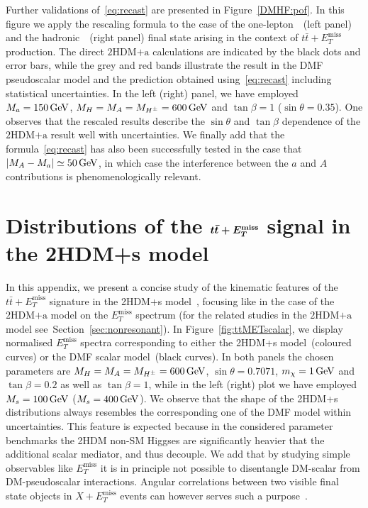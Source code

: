 \documentclass[a4paper, 11pt,notoc]{article}
\newcommand{\MET}{\ensuremath{E_T^\mathrm{miss}}\xspace}
\newcommand{\mA}{\ensuremath{M_{A}}\xspace}
\newcommand{\ma}{\ensuremath{M_{a}}\xspace}
\newcommand{\mH}{\ensuremath{M_{H}}\xspace}
\newcommand{\mHc}{\ensuremath{M_{H^{\pm}}}\xspace}
\newcommand{\hdma}{\ensuremath{\textrm{2HDM+a}}\xspace}
\def\bm#1{\mbox{\boldmath$#1$\unboldmath}}
\begin{document}
Further validations of~\eqref{eq:recast} are presented in Figure~\ref{DMHF:pof}. In this figure we apply the rescaling formula to the case of the  one-lepton~\cite{Aaboud:2017aeu}~(left panel)   and the hadronic~\cite{Aaboud:2017rzf}~(right panel)  final state arising in the context of $t \bar t+\MET$ production. The direct \hdma calculations are indicated by the black dots and error bars, while the grey and red  bands illustrate the result in the DMF pseudoscalar model and the prediction obtained using~\eqref{eq:recast} including statistical uncertainties.  In the left (right) panel, we have employed $\ma = 150 \, {\rm GeV}$, $\mH= \mA = \mHc = 600 \, {\rm GeV}$ and $\tan \beta = 1$ ($\sin\theta=0.35$). One observes that the rescaled results describe the $\sin \theta$ and $\tan \beta$ dependence of the \hdma result well with uncertainties.  We finally add that the formula~\eqref{eq:recast} has also been successfully tested in the case that $|\mA - \ma| \simeq 50 \, {\rm GeV}$, in which case the interference between the $a$ and $A$ contributions is phenomenologically relevant.  


\section{Distributions of the $\bm{t \bar t + \MET}$ signal in the 2HDM+s model}
\label{app:ttMETscalar}

In this appendix, we present a concise study of the kinematic features of the  $t \bar t + \MET$ signature in the 2HDM+s model~\cite{Bell:2016ekl,Bell:2017rgi}, focusing like in the case of the  \hdma model on the $\MET$ spectrum (for the related studies in the \hdma model see~Section~\ref{sec:nonresonant}).  In Figure~\ref{fig:ttMETscalar}, we display normalised $\MET$ spectra corresponding to either  the 2HDM+s model~(coloured curves) or the DMF scalar   model~(black curves). In both panels the chosen parameters are $M_H = M_A = M_{H^\pm} = 600 \, {\rm GeV}$, $\sin \theta = 0.7071$, $m_\chi = 1 \, {\rm GeV}$ and $\tan \beta = 0.2$ as well as $\tan \beta = 1$, while in the left (right) plot we have employed $M_s = 100 \, {\rm GeV}$ ($M_s = 400 \, {\rm GeV}$). We observe that  the shape of the 2HDM+s distributions always  resembles  the corresponding one of the DMF model within uncertainties. This feature is expected because in the considered parameter benchmarks the 2HDM non-SM Higgses are significantly heavier that the additional scalar mediator, and thus decouple. We add that by studying simple observables like $\MET$ it is in principle not possible to disentangle DM-scalar from DM-pseudoscalar interactions. Angular correlations between  two visible final state objects in $X+\MET$ events can however serves such a purpose~\cite{Haisch:2016gry,Cotta:2012nj,Haisch:2013fla,Crivellin:2015wva}. 
\end{document}
